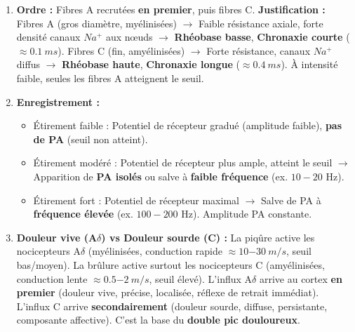 \documentclass[11pt]{article}
\begin{document}
\begin{corrige}
\begin{enumerate}
    \item \textbf{Ordre :} Fibres A recrutées \textbf{en premier}, puis fibres C. \textbf{Justification :} Fibres A (gros diamètre, myélinisées) $\rightarrow$ Faible résistance axiale, forte densité canaux $Na^+$ aux nœuds $\rightarrow$ \textbf{Rhéobase basse}, \textbf{Chronaxie courte} ($\approx \SI{0,1}{ms}$). Fibres C (fin, amyélinisées) $\rightarrow$ Forte résistance, canaux $Na^+$ diffus $\rightarrow$ \textbf{Rhéobase haute}, \textbf{Chronaxie longue} ($\approx \SI{0,4}{ms}$). À intensité faible, seules les fibres A atteignent le seuil.
    \item \textbf{Enregistrement :}
        \begin{itemize}
            \item Étirement faible : Potentiel de récepteur gradué (amplitude faible), \textbf{pas de PA} (seuil non atteint).
            \item Étirement modéré : Potentiel de récepteur plus ample, atteint le seuil $\rightarrow$ Apparition de \textbf{PA isolés} ou salve à \textbf{faible fréquence} (ex. $10-20$ Hz).
            \item Étirement fort : Potentiel de récepteur maximal $\rightarrow$ Salve de PA à \textbf{fréquence élevée} (ex. $100-200$ Hz). Amplitude PA constante.
        \end{itemize}
    \item \textbf{Douleur vive (A$\delta$) vs Douleur sourde (C) :} La piqûre active les nocicepteurs A$\delta$ (myélinisées, conduction rapide $\approx \SI{10-30}{m/s}$, seuil bas/moyen). La brûlure active surtout les nocicepteurs C (amyélinisées, conduction lente $\approx \SI{0,5-2}{m/s}$, seuil élevé). L'influx A$\delta$ arrive au cortex \textbf{en premier} (douleur vive, précise, localisée, réflexe de retrait immédiat). L'influx C arrive \textbf{secondairement} (douleur sourde, diffuse, persistante, composante affective). C'est la base du \textbf{double pic douloureux}.
\end{enumerate}
\end{corrige}
\end{document}
